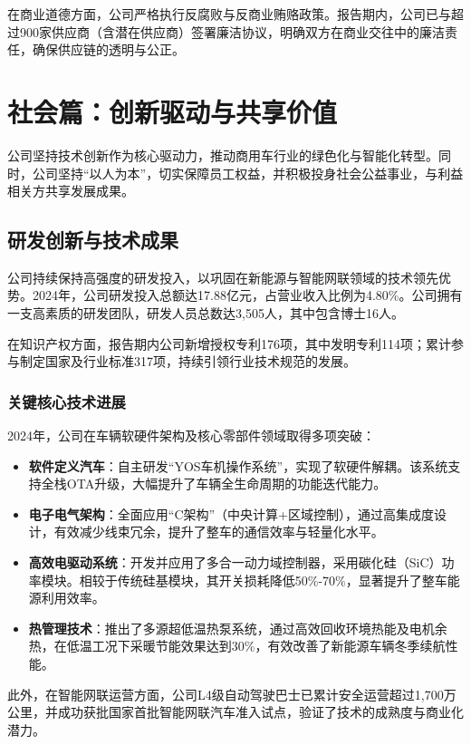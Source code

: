 \documentclass[a4paper,12pt]{article}
\begin{document}
在商业道德方面，公司严格执行反腐败与反商业贿赂政策。报告期内，公司已与超过900家供应商（含潜在供应商）签署廉洁协议，明确双方在商业交往中的廉洁责任，确保供应链的透明与公正。

\section{社会篇：创新驱动与共享价值}

公司坚持技术创新作为核心驱动力，推动商用车行业的绿色化与智能化转型。同时，公司坚持“以人为本”，切实保障员工权益，并积极投身社会公益事业，与利益相关方共享发展成果。

\subsection{研发创新与技术成果}

公司持续保持高强度的研发投入，以巩固在新能源与智能网联领域的技术领先优势。2024年，公司研发投入总额达17.88亿元，占营业收入比例为4.80\%。公司拥有一支高素质的研发团队，研发人员总数达3,505人，其中包含博士16人。

在知识产权方面，报告期内公司新增授权专利176项，其中发明专利114项；累计参与制定国家及行业标准317项，持续引领行业技术规范的发展。

\subsubsection{关键核心技术进展}

2024年，公司在车辆软硬件架构及核心零部件领域取得多项突破：
\begin{itemize}
    \item \textbf{软件定义汽车}：自主研发“YOS车机操作系统”，实现了软硬件解耦。该系统支持全栈OTA升级，大幅提升了车辆全生命周期的功能迭代能力。
    \item \textbf{电子电气架构}：全面应用“C架构”（中央计算+区域控制），通过高集成度设计，有效减少线束冗余，提升了整车的通信效率与轻量化水平。
    \item \textbf{高效电驱动系统}：开发并应用了多合一动力域控制器，采用碳化硅（SiC）功率模块。相较于传统硅基模块，其开关损耗降低50\%-70\%，显著提升了整车能源利用效率。
    \item \textbf{热管理技术}：推出了多源超低温热泵系统，通过高效回收环境热能及电机余热，在低温工况下采暖节能效果达到30\%，有效改善了新能源车辆冬季续航性能。
\end{itemize}

此外，在智能网联运营方面，公司L4级自动驾驶巴士已累计安全运营超过1,700万公里，并成功获批国家首批智能网联汽车准入试点，验证了技术的成熟度与商业化潜力。
\end{document}
